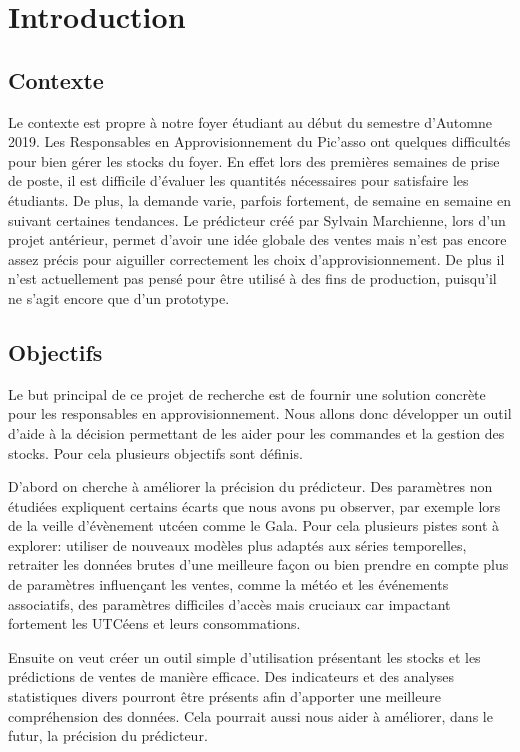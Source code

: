 \section{Introduction}
\label{sec:intro}

\subsection{Contexte}
\label{subsec:intro-context}

Le contexte est propre à notre foyer étudiant au début du semestre d'Automne 2019. Les Responsables en Approvisionnement du Pic’asso ont quelques difficultés pour bien gérer les stocks du foyer. En effet lors des premières semaines de prise de poste, il est difficile d’évaluer les quantités nécessaires pour satisfaire les étudiants. De plus, la demande varie, parfois fortement, de semaine en semaine en suivant certaines tendances. Le prédicteur créé par Sylvain Marchienne, lors d'un projet antérieur, permet d’avoir une idée globale des ventes mais n’est pas encore assez précis pour aiguiller correctement les choix d'approvisionnement. De plus il n’est actuellement pas pensé pour être utilisé à des fins de production, puisqu’il ne s’agit encore que d’un prototype.

\subsection{Objectifs}
\label{subsec:intro-objectives}

Le but principal de ce projet de recherche est de fournir une solution concrète pour les responsables en approvisionnement. Nous allons donc développer un outil d'aide à la décision permettant de les aider pour les commandes et la gestion des stocks. Pour cela plusieurs objectifs sont définis.

D'abord on cherche à améliorer la précision du prédicteur. Des paramètres non étudiées expliquent certains écarts que nous avons pu observer, par exemple lors de la veille d'évènement utcéen comme le Gala. Pour cela plusieurs pistes sont à explorer: utiliser de nouveaux modèles plus adaptés aux séries temporelles, retraiter les données brutes d'une meilleure façon ou bien prendre en compte plus de paramètres influençant les ventes, comme la météo et les événements associatifs, des paramètres difficiles d’accès mais cruciaux car impactant fortement les UTCéens et leurs consommations.

Ensuite on veut créer un outil simple d'utilisation présentant les stocks et les prédictions de ventes de manière efficace. Des indicateurs et des analyses statistiques divers pourront être présents afin d'apporter une meilleure compréhension des données. Cela pourrait aussi nous aider à améliorer, dans le futur, la précision du prédicteur.

